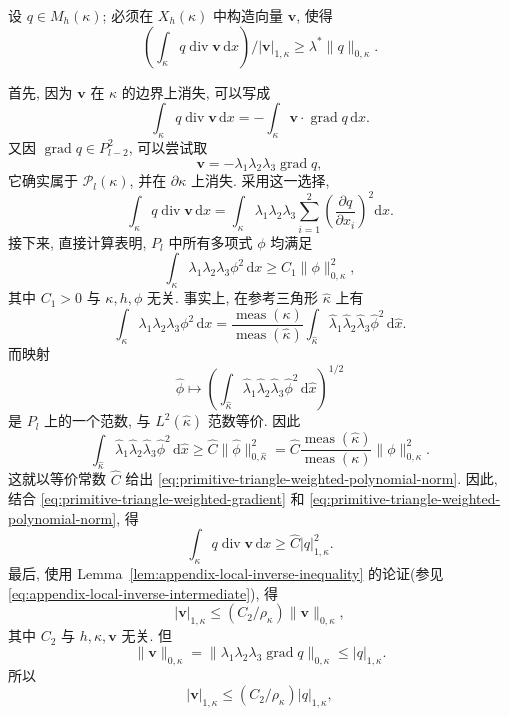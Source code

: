 \begin{Proof}
设 $q\in M_h(\kappa)$; 必须在 $X_h(\kappa)$ 中构造向量
$\mathbf v$, 使得
\begin{equation}\label{eq:primitive-triangle-local-inf-sup-construction}
\left(\int_\kappa q\operatorname{div}\mathbf v\,\mathrm dx\right)
/|\mathbf v|_{1,\kappa}
\geq\lambda^*\|q\|_{0,\kappa}.
\end{equation}

首先, 因为 $\mathbf v$ 在 $\kappa$ 的边界上消失, 可以写成
\[
\int_\kappa q\operatorname{div}\mathbf v\,\mathrm dx
=-\int_\kappa\mathbf v\cdot\operatorname{grad}q\,\mathrm dx.
\]
又因 $\operatorname{grad}q\in P_{l-2}^2$, 可以尝试取
\[
\mathbf v=-\lambda_1\lambda_2\lambda_3\operatorname{grad}q,
\]
它确实属于 $\mathcal{P}_l(\kappa)$, 并在 $\partial\kappa$ 上消失.
采用这一选择,
\begin{equation}\label{eq:primitive-triangle-weighted-gradient}
\int_\kappa q\operatorname{div}\mathbf v\,\mathrm dx
=\int_\kappa\lambda_1\lambda_2\lambda_3
\sum_{i=1}^2\left(\frac{\partial q}{\partial x_i}\right)^2\mathrm dx.
\end{equation}
接下来, 直接计算表明, $P_l$ 中所有多项式 $\phi$ 均满足
\begin{equation}\label{eq:primitive-triangle-weighted-polynomial-norm}
\int_\kappa\lambda_1\lambda_2\lambda_3\phi^2\,\mathrm dx
\geq C_1\|\phi\|_{0,\kappa}^2,
\end{equation}
其中 $C_1>0$ 与 $\kappa,h,\phi$ 无关. 事实上, 在参考三角形
$\hat\kappa$ 上有
\[
\int_\kappa\lambda_1\lambda_2\lambda_3\phi^2\,\mathrm dx
=\frac{\operatorname{meas}(\kappa)}{\operatorname{meas}(\hat\kappa)}
\int_{\hat\kappa}\hat\lambda_1\hat\lambda_2\hat\lambda_3
\hat\phi^2\,\mathrm d\hat x.
\]
而映射
\[
\hat\phi\longmapsto
\left(\int_{\hat\kappa}\hat\lambda_1\hat\lambda_2\hat\lambda_3
\hat\phi^2\,\mathrm d\hat x\right)^{1/2}
\]
是 $P_l$ 上的一个范数, 与 $L^2(\hat\kappa)$ 范数等价. 因此
\[
\int_{\hat\kappa}\hat\lambda_1\hat\lambda_2\hat\lambda_3
\hat\phi^2\,\mathrm d\hat x
\geq\hat C\|\hat\phi\|_{0,\hat\kappa}^2
=\hat C\frac{\operatorname{meas}(\hat\kappa)}
{\operatorname{meas}(\kappa)}\|\phi\|_{0,\kappa}^2.
\]
这就以等价常数 $\hat C$ 给出
\eqref{eq:primitive-triangle-weighted-polynomial-norm}. 因此, 结合
\eqref{eq:primitive-triangle-weighted-gradient} 和
\eqref{eq:primitive-triangle-weighted-polynomial-norm}, 得
\[
\int_\kappa q\operatorname{div}\mathbf v\,\mathrm dx
\geq\hat C|q|_{1,\kappa}^2.
\]
最后, 使用 Lemma~\ref{lem:appendix-local-inverse-inequality}
的论证(参见 \eqref{eq:appendix-local-inverse-intermediate}), 得
\[
|\mathbf v|_{1,\kappa}
\leq(C_2/\rho_\kappa)\|\mathbf v\|_{0,\kappa},
\]
其中 $C_2$ 与 $h,\kappa,\mathbf v$ 无关. 但
\[
\|\mathbf v\|_{0,\kappa}
=\|\lambda_1\lambda_2\lambda_3\operatorname{grad}q\|_{0,\kappa}
\leq|q|_{1,\kappa}.
\]
所以
\[
|\mathbf v|_{1,\kappa}
\leq(C_2/\rho_\kappa)|q|_{1,\kappa},
\]


\end{Proof}
